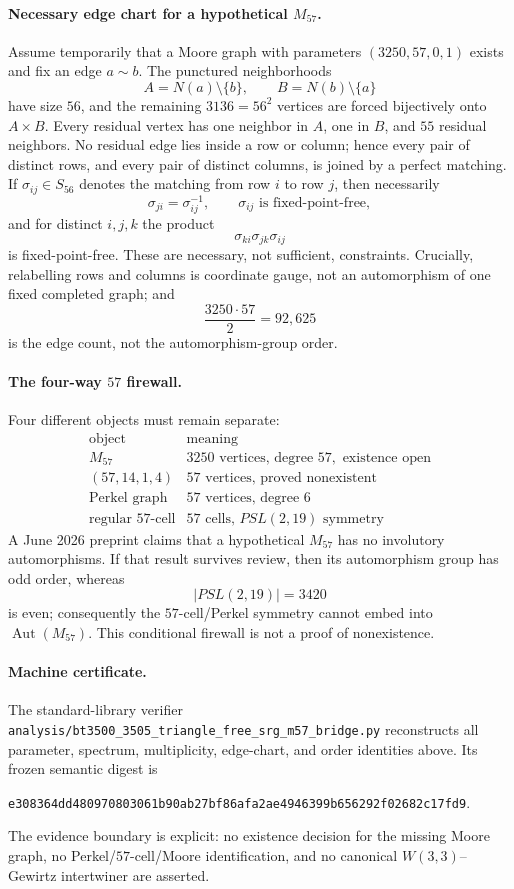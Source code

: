 \paragraph{Necessary edge chart for a hypothetical $M_{57}$.}
Assume temporarily that a Moore graph with parameters $(3250,57,0,1)$ exists
and fix an edge $a\!\sim\!b$.  The punctured neighborhoods
\[
A=N(a)\setminus\{b\},
\qquad
B=N(b)\setminus\{a\}
\]
have size $56$, and the remaining $3136=56^2$ vertices are forced bijectively
onto $A\times B$.  Every residual vertex has one neighbor in $A$, one in $B$,
and $55$ residual neighbors.  No residual edge lies inside a row or column;
hence every pair of distinct rows, and every pair of distinct columns, is
joined by a perfect matching.  If $\sigma_{ij}\in S_{56}$ denotes the matching
from row $i$ to row $j$, then necessarily
\[
\sigma_{ji}=\sigma_{ij}^{-1},
\qquad
\sigma_{ij}\text{ is fixed-point-free},
\]
and for distinct $i,j,k$ the product
\[
\sigma_{ki}\sigma_{jk}\sigma_{ij}
\]
is fixed-point-free.  These are necessary, not sufficient, constraints.
Crucially, relabelling rows and columns is coordinate gauge, not an
automorphism of one fixed completed graph; and
\[
\frac{3250\cdot57}{2}=92{,}625
\]
is the edge count, not the automorphism-group order.

\paragraph{The four-way $57$ firewall.}
Four different objects must remain separate:
\[
\begin{array}{c|c}
\text{object}&\text{meaning}\\ \hline
M_{57}&3250\text{ vertices, degree }57,\text{ existence open}\\
(57,14,1,4)&57\text{ vertices, proved nonexistent}\\
\text{Perkel graph}&57\text{ vertices, degree }6\\
\text{regular }57\text{-cell}&57\text{ cells, }PSL(2,19)\text{ symmetry}
\end{array}
\]
A June 2026 preprint claims that a hypothetical $M_{57}$ has no involutory
automorphisms.  If that result survives review, then its automorphism group has
odd order, whereas
\[
|PSL(2,19)|=3420
\]
is even; consequently the $57$-cell/Perkel symmetry cannot embed into
$\operatorname{Aut}(M_{57})$.  This conditional firewall is not a proof of
nonexistence.

\paragraph{Machine certificate.}
The standard-library verifier
\texttt{analysis/bt3500\_3505\_triangle\_free\_srg\_m57\_bridge.py}
reconstructs all parameter, spectrum, multiplicity, edge-chart, and order
identities above.  Its frozen semantic digest is
\begin{center}
\texttt{e308364dd480970803061b90ab27bf86afa2ae4946399b656292f02682c17fd9}.
\end{center}
The evidence boundary is explicit: no existence decision for the missing Moore
graph, no Perkel/$57$-cell/Moore identification, and no canonical
$W(3,3)$--Gewirtz intertwiner are asserted.
